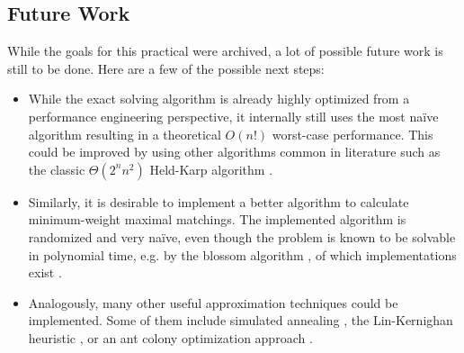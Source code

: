 \subsection{Future Work}
While the goals for this practical were archived, a lot of possible future work is still to be done. Here are a few of the possible next steps:
\begin{itemize}
\item While the exact solving algorithm is already highly optimized from a performance engineering perspective, it internally still uses the most na\"ive algorithm resulting in a theoretical $O(n!)$ worst-case performance. This could be improved by using other algorithms common in literature such as the classic $\Theta(2^n n^2)$ Held-Karp algorithm \cite{held_dynamic_1962}.
\item Similarly, it is desirable to implement a better algorithm to calculate minimum-weight maximal matchings.
  The implemented algorithm is randomized and very na\"ive,
  even though the problem is known to be solvable in polynomial time,
  e.g. by the blossom algorithm \cite{kolmogorov_blossom_2009}, 
  of which implementations exist \cite{kolmogorov_blossom_nodate}.
\item Analogously, many other useful approximation techniques could be implemented. Some of them include simulated annealing \cite{kirkpatrick_optimization_1983}, the Lin-Kernighan heuristic \cite{lin_effective_1973}, or an ant colony optimization approach \cite{chu_ant_2004}.
\end{itemize}
